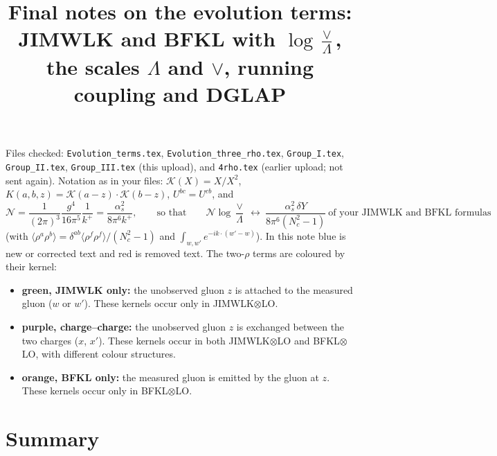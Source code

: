 \documentclass[10pt]{article}
\title{Final notes on the evolution terms:\\ JIMWLK and BFKL with $\log\frac{\vee}{\Lambda}$, the scales $\Lambda$ and $\vee$, running coupling and DGLAP}
\date{}
\numberwithin{equation}{section}
\newcommand{\new}[1]{{\color{blue}#1}}
\newcommand{\old}[1]{{\color{red}#1}}
\begin{document}
\maketitle
\noindent Files checked: \texttt{Evolution\_terms.tex}, \texttt{Evolution\_three\_rho.tex}, \texttt{Group\_I.tex}, \texttt{Group\_II.tex}, \texttt{Group\_III.tex} (this upload), and \texttt{4rho.tex} (earlier upload; not sent again). Notation as in your files: $\mathcal K(X)=X/X^2$, $K(a,b,z)=\mathcal K(a-z)\cdot\mathcal K(b-z)$, $U^{bc}=U^{cb}$, and
\begin{equation*}
\mathcal N=\frac{1}{(2\pi)^3}\frac{g^4}{16\pi^5}\frac{1}{k^+}=\frac{\alpha_s^2}{8\pi^6k^+},\qquad \text{so that}\qquad \mathcal N\log\frac{\vee}{\Lambda}\ \leftrightarrow\ \frac{\alpha_s^2\,\delta Y}{8\pi^6(N_c^2-1)}\ \text{of your JIMWLK and BFKL formulas}
\end{equation*}
(with $\langle\rho^a\rho^b\rangle=\delta^{ab}\langle\rho^f\rho^f\rangle/(N_c^2-1)$ and $\int_{w,w'}e^{-ik\cdot(w'-w)}$). In this note \new{blue} is new or corrected text and \old{red} is removed text. The two-$\rho$ terms are coloured by their kernel:
\begin{itemize}
\item {\color{JIM}\textbf{green, JIMWLK only:}} the unobserved gluon $z$ is attached to the measured gluon ($w$ or $w'$). These kernels occur only in JIMWLK$\otimes$LO.
\item {\color{CC}\textbf{purple, charge--charge:}} the unobserved gluon $z$ is exchanged between the two charges ($x$, $x'$). These kernels occur in both JIMWLK$\otimes$LO and BFKL$\otimes$LO, with different colour structures.
\item {\color{BFK}\textbf{orange, BFKL only:}} the measured gluon is emitted by the gluon at $z$. These kernels occur only in BFKL$\otimes$LO.
\end{itemize}

\section{Summary}
\end{document}
